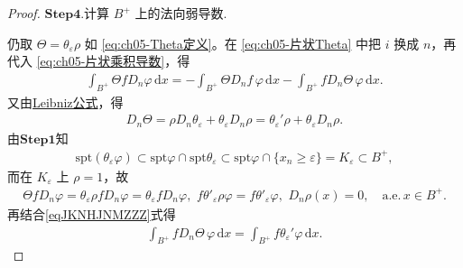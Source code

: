 \documentclass[../../main.tex]{subfiles}
\begin{document}
\begin{proof}
\noindent$\mathbf{Step}\bm{4}$.{\heiti 计算 $B^{+}$ 上的法向弱导数.}

仍取 $\Theta=\theta_{\varepsilon}\rho$ 如 \eqref{eq:ch05-Theta定义}。在 \eqref{eq:ch05-片状Theta} 中把 $i$ 换成 $n$，再代入 \eqref{eq:ch05-片状乘积导数}，得
\begin{align}
\int_{B^{+}}\Theta fD_n\varphi\,\mathrm{d}x
=-\int_{B^{+}}\Theta D_nf\,\varphi\,\mathrm{d}x
-\int_{B^{+}}fD_n\Theta\,\varphi\,\mathrm{d}x.
\label{eq:ch05-片状法向1}
\end{align}
又由\hyperref[theorem:ch05-弱导数性质-4]{Leibniz公式}，得
\begin{align}\label{eqJKNHJNMZZZ}
D_n\Theta=\rho D_n\theta_{\varepsilon}+\theta_{\varepsilon}D_n\rho
=\theta_{\varepsilon}'\rho+\theta_{\varepsilon}D_n\rho.
\end{align}
由$\mathbf{Step}\bm{1}$知
\begin{align}\label{eqrnjNJKHJV}
\mathrm{spt}(\theta _{\varepsilon}\varphi )\subset \mathrm{spt}\varphi \cap \mathrm{spt}\theta _{\varepsilon}\subset \mathrm{spt}\varphi \cap \{x_n\geqslant \varepsilon \}=K_{\varepsilon}\subset B^+,
\end{align}
而在 $K_{\varepsilon}$ 上 $\rho=1$，故
\begin{align}
\Theta fD_n\varphi=\theta_\varepsilon\rho fD_n\varphi=\theta_\varepsilon fD_n\varphi,\,\,f\theta' _{\varepsilon}\rho \varphi =f\theta'_{\varepsilon}\varphi ,\,\,D_n\rho (x)=0,\quad \mathrm{a}.\mathrm{e}.\,x\in B^+.\label{JKNVZN2342hnj}
\end{align}
再结合\eqref{eqJKNHJNMZZZ}式得
\begin{align}
\int_{B^{+}}fD_n\Theta\,\varphi\,\mathrm{d}x
=\int_{B^{+}}f\theta_{\varepsilon}'\varphi\,\mathrm{d}x.
\label{eq:ch05-片状法向2}
\end{align}


\end{proof}
\end{document}
